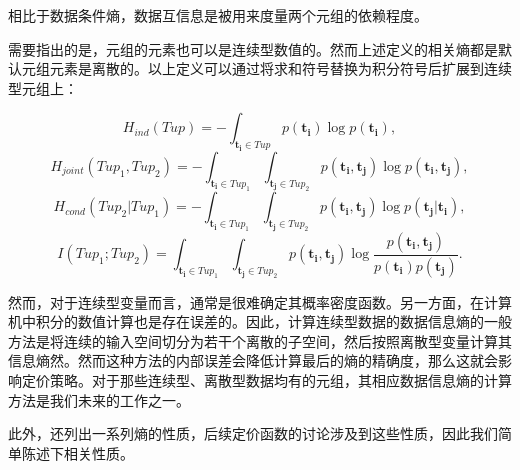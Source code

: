 相比于数据条件熵，数据互信息是被用来度量两个元组的依赖程度。

需要指出的是，元组的元素也可以是连续型数值的。然而上述定义的相关熵都是默认元组元素是离散的。以上定义可以通过将求和符号替换为积分符号后扩展到连续型元组上：

\begin{equation}
  H_{ind}(Tup)=-\int_{\bm{t_i} \in Tup}p(\bm{t_i})\log p(\bm{t_i}),
\end{equation}
\begin{equation}
  H_{joint}(Tup_1,Tup_2)=-\int_{\bm{t_i} \in Tup_1} \int_{\bm{t_j} \in Tup_2} p(\bm{t_i},\bm{t_j}) \log p(\bm{t_i},\bm{t_j}),
\end{equation}
\begin{equation}
  H_{cond}(Tup_2|Tup_1)=-\int_{\bm{t_i} \in Tup_1} \int_{\bm{t_j} \in Tup_2} p(\bm{t_i},\bm{t_j})\log p(\bm{t_j}|\bm{t_i}),
\end{equation}
\begin{equation}
  I(Tup_1;Tup_2)=\int_{\bm{t_i} \in Tup_1} \int_{\bm{t_j} \in Tup_2} p(\bm{t_i},\bm{t_j}) \log\frac{p(\bm{t_i},\bm{t_j})}{p(\bm{t_i})p(\bm{t_j})}.
\end{equation}

然而，对于连续型变量而言，通常是很难确定其概率密度函数。另一方面，在计算机中积分的数值计算也是存在误差的。因此，计算连续型数据的数据信息熵的一般方法是将连续的输入空间切分为若干个离散的子空间，然后按照离散型变量计算其信息熵然。然而这种方法的内部误差会降低计算最后的熵的精确度，那么这就会影响定价策略。对于那些连续型、离散型数据均有的元组，其相应数据信息熵的计算方法是我们未来的工作之一。

此外，\cite{shannon2001mathematical}还列出一系列熵的性质，后续定价函数的讨论涉及到这些性质，因此我们简单陈述下相关性质。

